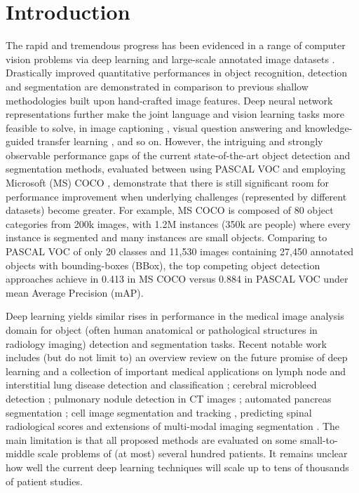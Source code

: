 \documentclass[10pt,twocolumn,letterpaper]{article}
\begin{document}
\section{Introduction}
The rapid and tremendous progress has been evidenced in a range of computer vision problems via deep learning and large-scale annotated image datasets \cite{krizhevsky2012imagenet,Russakovsky2015,Everingham2015,Lin2014COCO}. Drastically improved quantitative performances in object recognition, detection and segmentation
are demonstrated in comparison to previous shallow methodologies built upon hand-crafted image features. Deep neural network representations further make the joint language and vision learning tasks more feasible to solve, in image captioning \cite{Vinyals2015Show,Karpathy2015Deep,Plummer2015Flickr30k,Vendrov2016Order,Johnson2016DenseCap}, visual question answering \cite{Antol2015VQA,Tapaswi2015MovieQA,Wu2016Ask,Zhu2016Visual7W} and knowledge-guided transfer learning \cite{Ba2015Predicting,Qiao2016Less}, and so on. However, the intriguing and strongly observable performance gaps of the current state-of-the-art object detection and segmentation methods, evaluated between using PASCAL VOC \cite{Everingham2015} and employing Microsoft (MS) COCO \cite{Lin2014COCO}, demonstrate that there is still significant  room for performance improvement when underlying challenges (represented by different datasets) become greater. For example, MS COCO is composed of 80 object categories from 200k images, with 1.2M instances (350k are people) where every instance is segmented and many instances are small objects. Comparing to PASCAL VOC of only 20 classes and 11,530 images containing 27,450 annotated objects with bounding-boxes (BBox), the top competing object detection approaches achieve in 0.413 in MS COCO %
versus 0.884 in PASCAL VOC %
under mean Average Precision (mAP). 

Deep learning yields similar rises in performance in the medical image analysis domain for object (often human anatomical or pathological structures in radiology imaging) detection and segmentation tasks. Recent notable work includes (but do not limit to) an overview review on the future promise of deep learning \cite{Greenspan2016Guest} and a collection of important medical applications on lymph node and interstitial lung disease detection and classification \cite{roth2014new,Shin2016Deep}; cerebral microbleed detection \cite{Dou2016Automatic}; pulmonary nodule detection in CT images \cite{Setio2016Pulmonary}; automated pancreas segmentation \cite{roth2015deeporgan}; cell image segmentation and tracking \cite{ronneberger2015unet}, predicting spinal radiological scores \cite{Jamaludin2016SpineNet} and extensions of multi-modal imaging segmentation \cite{Moeskops2016Deep,Havaei2016HeMIS}. The main limitation is that all proposed methods are evaluated on some small-to-middle scale problems of (at most) several hundred patients. It remains unclear how well the current deep learning techniques will scale up to tens of thousands of patient studies.
\end{document}
